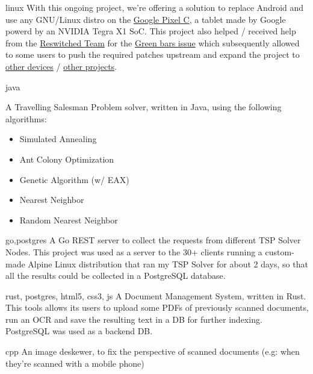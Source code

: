 \begin{CV}

    {}
    {linux}
    {With this ongoing project, we're offering a solution to replace Android and use any GNU/Linux distro 
    on the \href{https://en.wikipedia.org/wiki/Pixel_C}{Google Pixel C}, a tablet made by Google powerd by an NVIDIA Tegra X1 SoC.
    This project also helped / received help from the \href{https://reswitched.team/}{Reswitched Team} for the 
    \href{https://github.com/denysvitali/linux-on-pixel-c/issues/1}{Green bars issue} which subsequently allowed to
    some users to push the required patches upstream and expand the project to 
    \href{https://github.com/fail0verflow/switch-linux}{other devices} / 
    \href{https://github.com/postmarketOS/pmbootstrap/pull/1534}{other projects}.}

    {}
    {java}
    {A Travelling Salesman Problem solver, written in Java, using the following algorithms:
    \begin{itemize}
        \item Simulated Annealing
        \item Ant Colony Optimization
        \item Genetic Algorithm (w/ EAX)
        \item Nearest Neighbor
        \item Random Nearest Neighbor
    \end{itemize}}

    
    {}
    {go,postgres}
    {A Go REST server to collect the requests from different TSP Solver Nodes. This project was used 
    as a server to the 30+ clients running a custom-made Alpine Linux distribution that ran my TSP Solver for
    about 2 days, so that all the results could be collected in a PostgreSQL database.}

    {}
    {rust, postgres, html5, css3, js}
    {A Document Management System, written in Rust. This tools allows its users to upload some PDFs of previously
    scanned documents, run an OCR and save the resulting text in a DB for further indexing. PostgreSQL was used as a
    backend DB.}

    {}
    {cpp}
    {An image deskewer, to fix the perspective of scanned documents (e.g: when they're scanned with a mobile phone)}



\end{CV}
